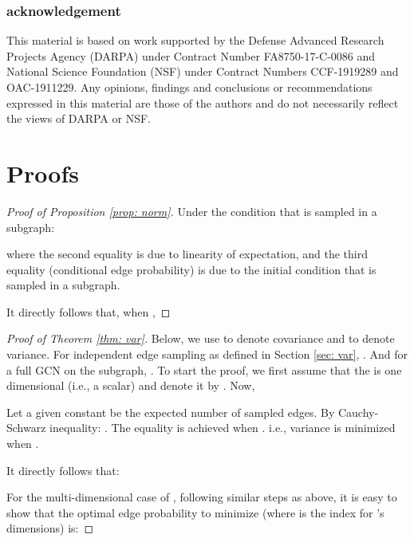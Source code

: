 \documentclass{article} \usepackage{iclr2020_conference,times}
\begin{document}
%
 
\subsubsection*{acknowledgement}
This material is based on work supported
by the Defense Advanced Research Projects Agency (DARPA) under Contract Number FA8750-17-C-0086 and National Science Foundation (NSF) under Contract Numbers CCF-1919289 and OAC-1911229. Any opinions, findings and conclusions or recommendations
expressed in this material are those of the authors and do not necessarily reflect the views of DARPA or NSF.




\appendix
\appendix
\section{Proofs\label{appendix: proof}}

\begin{proof}[Proof of Proposition \ref{prop: norm}]
Under the condition that  is sampled in a subgraph:

where the second equality is due to linearity of expectation, and the third equality (conditional edge probability) is due to the initial condition that  is sampled in a subgraph.

It directly follows that, when ,


\end{proof}

\begin{proof}[Proof of Theorem \ref{thm: var}]
Below, we use  to denote covariance and  to denote variance. 
For independent edge sampling as defined in Section \ref{sec: var}, . And for a full GCN on the subgraph, . To start the proof, we first assume that the  is one dimensional (i.e., a scalar) and denote it by .
Now,

Let a given constant  be the expected number of sampled edges.
By Cauchy-Schwarz inequality: . 
The equality is achieved when . i.e., variance is minimized when
.

It directly follows that:

For the multi-dimensional case of , following similar steps as above, it is easy to show that the optimal edge probability to minimize  (where  is the index for 's dimensions) is:

\end{proof}
\end{document}
